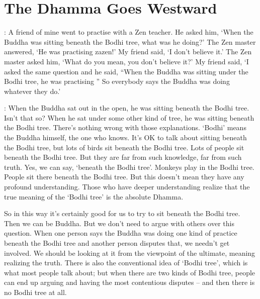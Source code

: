 
\chapter{The Dhamma Goes Westward}

\noindent{}: A friend of mine went to practise with a Zen teacher. He asked him, `When the Buddha was sitting beneath the Bodhi tree, what was he doing?' The Zen master answered, `He was practising zazen!' My friend said, `I don't believe it.' The Zen master asked him, `What do you mean, you don't believe it?' My friend said, `I asked  the same question and he said, ``When the Buddha was sitting under the Bodhi tree, he was practising '' So everybody says the Buddha was doing whatever they do.' 

\noindent{}: When the Buddha sat out in the open, he was sitting beneath the Bodhi tree. Isn't that so? When he sat under some other kind of tree, he was sitting beneath the Bodhi tree. There's nothing wrong with those explanations. `Bodhi' means the Buddha himself, the one who knows. It's OK to talk about sitting beneath the Bodhi tree, but lots of birds sit beneath the Bodhi tree. Lots of people sit beneath the Bodhi tree. But they are far from such knowledge, far from such truth. Yes, we can say, `beneath the Bodhi tree'. Monkeys play in the Bodhi tree. People sit there beneath the Bodhi tree. But this doesn't mean they have any profound understanding. Those who have deeper understanding realize that the true meaning of the `Bodhi tree' is the absolute Dhamma. 

So in this way it's certainly good for us to try to sit beneath the Bodhi tree. Then we can be Buddha. But we don't need to argue with others over this question. When one person says the Buddha was doing one kind of practice beneath the Bodhi tree and another person disputes that, we needn't get involved. We should be looking at it from the viewpoint of the ultimate, meaning realizing the truth. There is also the conventional idea of `Bodhi tree', which is what most people talk about; but when there are two kinds of Bodhi tree, people can end up arguing and having the most contentious disputes -- and then there is no Bodhi tree at all. 

